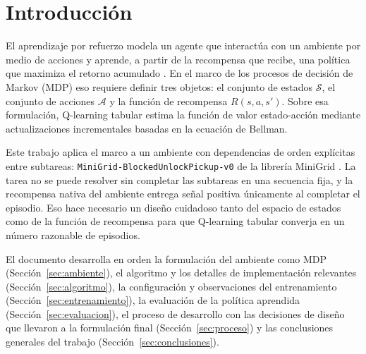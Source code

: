\documentclass[11pt,a4paper]{article}
\begin{document}
\begin{abstract}
\noindent
Se modela el ambiente \texttt{MiniGrid-BlockedUnlockPickup-v0} como un
proceso de decisión de Markov determinista y se entrena un agente
Q-learning tabular que lo resuelve consistentemente. La tarea exige
encadenar cinco subtareas obligatorias bajo un único inventario: mover
una bola que bloquea una puerta, recoger la llave, abrir la puerta,
soltar la llave y recoger la caja objetivo. Para que el espacio de
estados sea Markoviano sobre la función de recompensa con \emph{shaping}
por subtareas, definimos el estado como una tupla de ocho componentes
que incluye banderas de progreso persistentes. Tras \num{10000} episodios
de entrenamiento el agente alcanza \(100/100\) de éxito en evaluación
greedy con recompensa promedio \(+2.771\) (máximo teórico \(+2.80\)),
resolviendo el ambiente en \(29\) pasos.
\end{abstract}

\section{Introducción}
\label{sec:intro}

El aprendizaje por refuerzo modela un agente que interactúa con un
ambiente por medio de acciones y aprende, a partir de la recompensa que
recibe, una política que maximiza el retorno acumulado \cite{sutton}. En
el marco de los procesos de decisión de Markov (MDP) eso requiere
definir tres objetos: el conjunto de estados \(\mathcal{S}\), el
conjunto de acciones \(\mathcal{A}\) y la función de recompensa
\(R(s, a, s')\). Sobre esa formulación, Q-learning tabular
\cite{watkins} estima la función de valor estado-acción mediante
actualizaciones incrementales basadas en la ecuación de Bellman.

Este trabajo aplica el marco a un ambiente con dependencias de orden
explícitas entre subtareas: \texttt{MiniGrid-BlockedUnlockPickup-v0} de
la librería MiniGrid \cite{minigrid}. La tarea no se puede resolver sin
completar las subtareas en una secuencia fija, y la recompensa nativa
del ambiente entrega señal positiva únicamente al completar el episodio.
Eso hace necesario un diseño cuidadoso tanto del espacio de estados
como de la función de recompensa para que Q-learning tabular converja
en un número razonable de episodios.

El documento desarrolla en orden la formulación del ambiente como MDP
(Sección~\ref{sec:ambiente}), el algoritmo y los detalles de
implementación relevantes (Sección~\ref{sec:algoritmo}), la
configuración y observaciones del entrenamiento
(Sección~\ref{sec:entrenamiento}), la evaluación de la política
aprendida (Sección~\ref{sec:evaluacion}), el proceso de desarrollo con
las decisiones de diseño que llevaron a la formulación final
(Sección~\ref{sec:proceso}) y las conclusiones generales del trabajo
(Sección~\ref{sec:conclusiones}).
\end{document}
